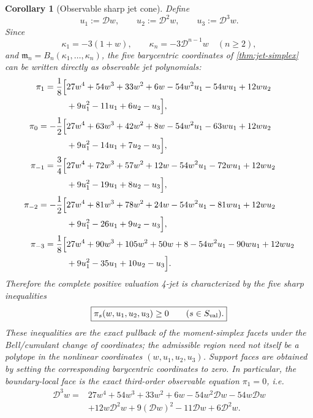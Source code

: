\documentclass[aps,prd,preprint,onecolumn,nofootinbib,superscriptaddress,showkeys]{revtex4-2}
\numberwithin{equation}{section}
\theoremstyle{definition}
\theoremstyle{plain}
\newtheorem{corollary}{Corollary}[section]
\newcommand{\Dil}{\mathscr D}
\begin{document}
\begin{corollary}[Observable sharp jet cone]\label{cor:observable-jet-cone}
Define
\[
u_1:=\Dil w,\qquad u_2:=\Dil^2w,\qquad u_3:=\Dil^3w.
\]
Since
\[
\kappa_1=-3(1+w),
\qquad
\kappa_n=-3\Dil^{n-1}w\quad(n\ge2),
\]
and $\mathfrak m_n=B_n(\kappa_1,\ldots,\kappa_n)$, the five barycentric coordinates of \cref{thm:jet-simplex} can be written directly as observable jet polynomials:
\begin{align}
\pi_1=\frac18\Bigl[&27w^4+54w^3+33w^2+6w
-54w^2u_1-54wu_1+12wu_2\nonumber\\
&+9u_1^2-11u_1+6u_2-u_3\Bigr],\label{eq:pi1-wjet}\\
\pi_0=-\frac12\Bigl[&27w^4+63w^3+42w^2+8w
-54w^2u_1-63wu_1+12wu_2\nonumber\\
&+9u_1^2-14u_1+7u_2-u_3\Bigr],\\
\pi_{-1}=\frac34\Bigl[&27w^4+72w^3+57w^2+12w
-54w^2u_1-72wu_1+12wu_2\nonumber\\
&+9u_1^2-19u_1+8u_2-u_3\Bigr],\\
\pi_{-2}=-\frac12\Bigl[&27w^4+81w^3+78w^2+24w
-54w^2u_1-81wu_1+12wu_2\nonumber\\
&+9u_1^2-26u_1+9u_2-u_3\Bigr],\\
\pi_{-3}=\frac18\Bigl[&27w^4+90w^3+105w^2+50w+8
-54w^2u_1-90wu_1+12wu_2\nonumber\\
&+9u_1^2-35u_1+10u_2-u_3\Bigr].
\end{align}
Therefore the complete positive valuation 4-jet is characterized by the five sharp inequalities
\begin{equation}
\boxed{\pi_s(w,u_1,u_2,u_3)\ge0\qquad(s\in S_{\rm val}).}
\end{equation}
These inequalities are the exact pullback of the moment-simplex facets under the Bell/cumulant change of coordinates; the admissible region need not itself be a polytope in the nonlinear coordinates $(w,u_1,u_2,u_3)$.  Support faces are obtained by setting the corresponding barycentric coordinates to zero.  In particular, the boundary-local face is the exact third-order observable equation $\pi_1=0$, i.e.
\begin{equation}
\boxed{
\begin{aligned}
\Dil^3w={}&27w^4+54w^3+33w^2+6w
-54w^2\Dil w-54w\Dil w\\
&+12w\Dil^2w+9(\Dil w)^2-11\Dil w+6\Dil^2w.
\end{aligned}}
\label{eq:boundary-w-closure}
\end{equation}
\end{corollary}
\end{document}
